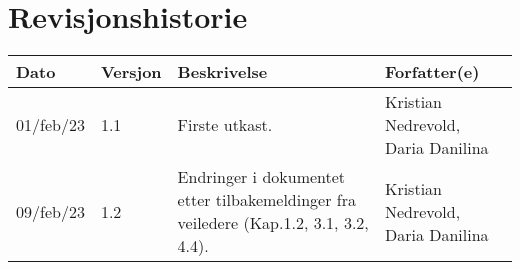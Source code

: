\section*{Revisjonshistorie}

\setcounter{page}{1}

\begin{table}[H]
\centering 
\begin{tabular}{|l|l|p{6cm}|p{4cm}|} 
\hline
\textbf{Dato} & \textbf{Versjon} & \textbf{Beskrivelse} & \textbf{Forfatter(e)}\\
\hline\hline 
01/feb/23 & 1.1 & Firste utkast. & Kristian Nedrevold, Daria Danilina\\
\hline
 09/feb/23 & 1.2 & Endringer i dokumentet etter tilbakemeldinger fra veiledere (Kap.1.2, 3.1, 3.2, 4.4). & Kristian Nedrevold, Daria Danilina\\
 \hline
\end{tabular}
\end{table}

